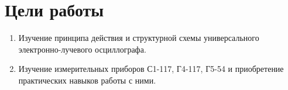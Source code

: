 \section{Цели работы}

\begin{enumerate}

  \item Изучение принципа действия и структурной схемы универсального электронно-лучевого осциллографа.
  \item Изучение измерительных приборов С1-117, Г4-117, Г5-54 и приобретение практических навыков работы с ними.
  
\end{enumerate}

